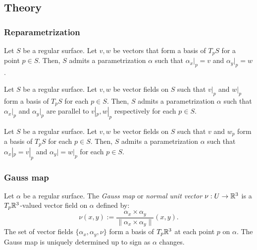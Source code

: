 \documentclass{../exp}
\def\a{\alpha}
\begin{document}
\subsection{Theory}

\subsubsection{Reparametrization}


\begin{thm}
Let $S$ be a regular surface.
Let $v,w$ be vectors that form a basis of $T_pS$ for a point $p\in S$.
Then, $S$ admits a parametrization $\a$ such that $\a_x|_p=v$ and $\a_y|_p=w$.
\end{thm}
\begin{thm}
Let $S$ be a regular surface.
Let $v,w$ be vector fields on $S$ such that $v|_p$ and $w|_p$ form a basis of $T_pS$ for each $p\in S$.
Then, $S$ admits a parametrization $\a$ such that $\a_x|_p$ and $\a_y|_p$ are parallel to $v|_p,w|_p$ respectively for each $p\in S$.
\end{thm}
\begin{thm}
Let $S$ be a regular surface.
Let $v,w$ be vector fields on $S$ such that $v$ and $w_p$ form a basis of $T_pS$ for each $p\in S$.
Then, $S$ admits a parametrization $\a$ such that $\a_x|_p=v|_p$ and $\a_y|=w|_p$ for each $p\in S$.
\end{thm}


\subsubsection{Gauss map}

\begin{defn}
Let $\a$ be a regular surface.
The \emph{Gauss map} or \emph{normal unit vector} $\nu:U\to\R^3$ is a $T_p\mathbb{R}^3$-valued vector field on $\a$ defined by:
\[\nu(x,y):=\frac{\a_x\times \a_y}{\|\a_x\times \a_y\|}(x,y).\]
The set of vector fields $\{\a_x,\a_y,\nu\}$ form a basis of $T_p\mathbb{R}^3$ at each point $p$ on $\a$.
The Gauss map is uniquely determined up to sign as $\a$ changes.
\end{defn}
\end{document}
